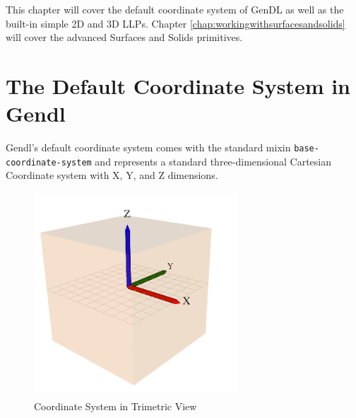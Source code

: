 \documentclass [11pt]{book}
\begin{document}
This chapter will cover the default coordinate system of GenDL as well as the built-in simple 2D and 3D LLPs. Chapter 
\ref{chap:workingwithsurfacesandsolids} will cover the advanced Surfaces and Solids primitives.



\section{The Default Coordinate System in Gendl}

\label{sec:thedefaultcoordinatesystemingendl}



Gendl's default coordinate system comes with the standard mixin \texttt{base-coordinate-system} and represents a standard three-dimensional Cartesian Coordinate system with X, Y, and Z dimensions.


\begin{figure}
\begin{center}
\includegraphics[width=3in,height=3in]{../images/coord-sys-tri.png}
\end{center}

\caption{Coordinate System in Trimetric View}

\label{fig:coord-sys-tri}

\end{figure}
\end{document}
